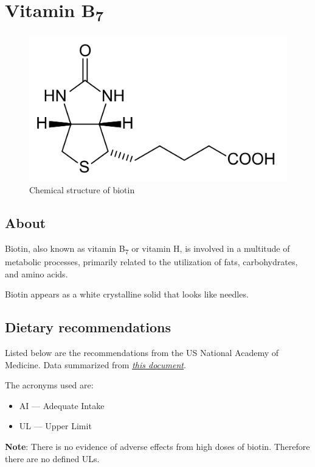 \documentclass{book}
\begin{document}
\begin{sloppypar}
\chapter{Vitamin B\texorpdfstring{\textsubscript{7}}{7}}
\begin{figure}[h]
	\caption{Chemical structure of biotin}
	\centering \includegraphics[width=\textwidth]{images/Vitamin_B7_chemical_structure}
\end{figure}
\newpage

\section{About}
Biotin, also known as vitamin B\textsubscript{7} or vitamin H, is involved in a multitude of metabolic processes, primarily related to the utilization of fats, carbohydrates, and amino acids.

Biotin appears as a white crystalline solid that looks like needles.

\section{Dietary recommendations}
Listed below are the recommendations from the US National Academy of Medicine. Data summarized from \href{https://nap.nationalacademies.org/read/6015/chapter/13}{\textit{this document}}.

The acronyms used are:
\begin{itemize}
	\item AI --- Adequate Intake
	\item UL --- Upper Limit
\end{itemize}

\textbf{Note}: There is no evidence of adverse effects from high doses of biotin. Therefore there are no defined ULs.


\end{sloppypar}
\end{document}
